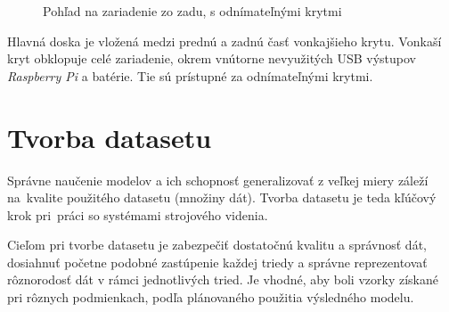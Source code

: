         \begin{figure}[H]
            \centering
            \caption{Pohľad na zariadenie zo zadu, s odnímateľnými krytmi}
        \end{figure}

        Hlavná doska je vložená medzi prednú a zadnú časť vonkajšieho krytu. Vonkaší kryt obklopuje celé zariadenie, okrem vnútorne nevyužitých USB výstupov \emph{Raspberry Pi} a batérie. Tie sú prístupné za odnímateľnými krytmi.  

\chapter{Tvorba datasetu}

    Správne naučenie modelov a ich schopnosť generalizovať z veľkej miery záleží na~kvalite použitého datasetu (množiny dát). Tvorba datasetu je teda kľúčový krok pri~práci so systémami strojového videnia.

    Cieľom pri tvorbe datasetu je zabezpečiť dostatočnú kvalitu a správnosť dát, dosiahnuť početne podobné zastúpenie každej triedy a správne reprezentovať rôznorodosť dát v rámci jednotlivých tried. Je vhodné, aby boli vzorky získané pri rôznych podmienkach, podľa plánovaného použitia výsledného modelu.


